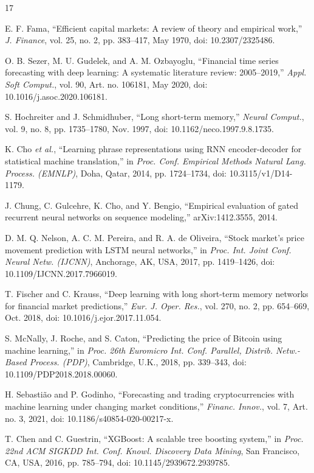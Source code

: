 \documentclass[conference]{IEEEtran}
\begin{document}
\begin{thebibliography}{17}

E. F. Fama, ``Efficient capital markets: A review of theory and empirical work,'' \emph{J. Finance}, vol. 25, no. 2, pp. 383--417, May 1970, doi: 10.2307/2325486.

O. B. Sezer, M. U. Gudelek, and A. M. Ozbayoglu, ``Financial time series forecasting with deep learning: A systematic literature review: 2005--2019,'' \emph{Appl. Soft Comput.}, vol. 90, Art. no. 106181, May 2020, doi: 10.1016/j.asoc.2020.106181.

S. Hochreiter and J. Schmidhuber, ``Long short-term memory,'' \emph{Neural Comput.}, vol. 9, no. 8, pp. 1735--1780, Nov. 1997, doi: 10.1162/neco.1997.9.8.1735.

K. Cho \emph{et al.}, ``Learning phrase representations using RNN encoder-decoder for statistical machine translation,'' in \emph{Proc. Conf. Empirical Methods Natural Lang. Process. (EMNLP)}, Doha, Qatar, 2014, pp. 1724--1734, doi: 10.3115/v1/D14-1179.

J. Chung, C. Gulcehre, K. Cho, and Y. Bengio, ``Empirical evaluation of gated recurrent neural networks on sequence modeling,'' arXiv:1412.3555, 2014.

D. M. Q. Nelson, A. C. M. Pereira, and R. A. de Oliveira, ``Stock market's price movement prediction with LSTM neural networks,'' in \emph{Proc. Int. Joint Conf. Neural Netw. (IJCNN)}, Anchorage, AK, USA, 2017, pp. 1419--1426, doi: 10.1109/IJCNN.2017.7966019.

T. Fischer and C. Krauss, ``Deep learning with long short-term memory networks for financial market predictions,'' \emph{Eur. J. Oper. Res.}, vol. 270, no. 2, pp. 654--669, Oct. 2018, doi: 10.1016/j.ejor.2017.11.054.

S. McNally, J. Roche, and S. Caton, ``Predicting the price of Bitcoin using machine learning,'' in \emph{Proc. 26th Euromicro Int. Conf. Parallel, Distrib. Netw.-Based Process. (PDP)}, Cambridge, U.K., 2018, pp. 339--343, doi: 10.1109/PDP2018.2018.00060.

H. Sebasti\~ao and P. Godinho, ``Forecasting and trading cryptocurrencies with machine learning under changing market conditions,'' \emph{Financ. Innov.}, vol. 7, Art. no. 3, 2021, doi: 10.1186/s40854-020-00217-x.

T. Chen and C. Guestrin, ``XGBoost: A scalable tree boosting system,'' in \emph{Proc. 22nd ACM SIGKDD Int. Conf. Knowl. Discovery Data Mining}, San Francisco, CA, USA, 2016, pp. 785--794, doi: 10.1145/2939672.2939785.


\end{thebibliography}
\end{document}
